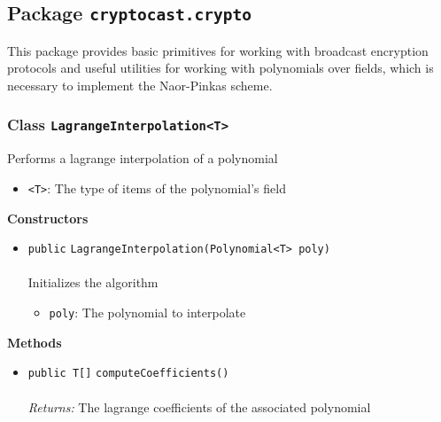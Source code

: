 \subsection{Package \lstinline!cryptocast.crypto!}
This package provides basic primitives for working with broadcast encryption protocols
 and useful utilities for working with polynomials over fields, which is necessary to implement
 the Naor-Pinkas scheme.

\subsubsection{Class \lstinline|LagrangeInterpolation<T>|}
Performs a lagrange interpolation of a polynomial \\
\noindent\begin{minipage}[t]{5cm}
\vspace{0.3em}
\hspace*{2em}
\vspace{0.3em}
\end{minipage}

\begin{itemize}
\item \lstinline|<T>|: The type of items of the polynomial's field
\end{itemize}



\textbf{\sffamily Constructors}
\begin{itemize}
\item \lstinline|public| \lstinline|LagrangeInterpolation|\lstinline|(Polynomial<T> poly)|\\ \\[-0.6em]
Initializes the algorithm
\begin{itemize}
\item \lstinline|poly|: The polynomial to interpolate
\end{itemize}



\end{itemize}


\textbf{\sffamily Methods}
\begin{itemize}
\item \lstinline|public T[]| \lstinline|computeCoefficients|\lstinline|()|\\ \\[-0.6em]
\emph{Returns:} The lagrange coefficients of the associated polynomial



\end{itemize}

